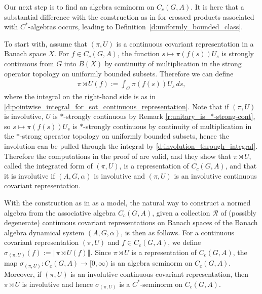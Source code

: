 \documentclass{amsart}
\theoremstyle{plain}
\theoremstyle{definition}
\numberwithin{equation}{section}
\begin{document}
Our next step is to find an algebra seminorm on $C_c(G,A)$. It is here that a substantial difference with the construction as in \cite{williams} for crossed products associated with $C^*$-algebras occurs, leading to Definition~\ref{d:uniformly_bounded_class}.

To start with, assume that ${(\pi,U)}$ is a continuous covariant representation in a Banach space $X$. For $f \in C_c(G,A)$, the function $s \mapsto \pi(f(s))U_s$ is strongly continuous from $G$ into $B(X)$ by continuity of multiplication in the strong operator topology on uniformly bounded subsets.  Therefore we can define
\begin{align}\label{d:intformdef}
 {\pi \rtimes U}(f) := \int_G \pi(f(s))U_s {\,ds},
\end{align}
where the integral on the right-hand side is as in \eqref{d:pointwise_integral_for_sot_continuous_representation}. Note that if ${(\pi,U)}$ is involutive, $U$ is $*$-strongly continuous by Remark \ref{r:unitary_is_*-strong-cont}, so $s \mapsto \pi(f(s))U_s$ is $*$-strongly continuous by continuity of multiplication in the $*$-strong operator topology on uniformly bounded subsets, hence the involution can be pulled through the integral by \eqref{d:involution_through_integral}. Therefore the computations in the proof of \cite[Proposition~2.23]{williams} are valid, and they show that ${\pi \rtimes U}$, called the integrated form of ${(\pi,U)}$, is a representation of $C_c(G,A)$, and that it is involutive if ${(A,G,\alpha)}$ is involutive and ${(\pi,U)}$ is an involutive continuous covariant representation.

With the construction as in \cite{williams} as a model, the natural way to construct a normed algebra from the associative algebra $C_c(G,A)$, given a collection ${\mathcal R}$ of (possibly degenerate) continuous covariant representations on Banach spaces of the Banach algebra dynamical system ${(A,G,\alpha)}$, is then as follows. For a continuous covariant representation ${(\pi,U)}$ and $f \in C_c(G,A)$, we define $\sigma_{(\pi,U)}(f) := {\left\Vert {{\pi \rtimes U}(f)} \right\Vert}$. Since ${\pi \rtimes U}$ is a representation of $C_c(G,A)$, the map $\sigma_{(\pi,U)}:C_c(G,A) \to [0,\infty)$ is an algebra seminorm on $C_c(G,A)$. Moreover, if ${(\pi,U)}$ is an involutive continuous covariant representation, then ${\pi \rtimes U}$ is involutive and hence $\sigma_{(\pi,U)}$ is a $C^*$-seminorm on $C_c(G,A)$.
\end{document}

